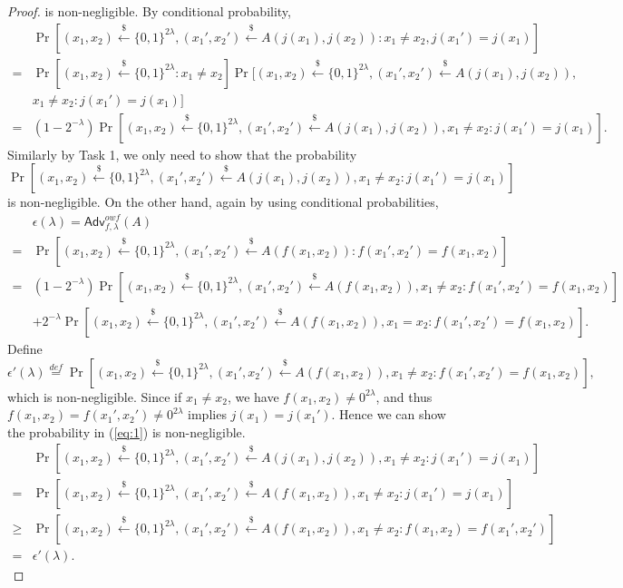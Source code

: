 \documentclass[12pt]{article}
\newcommand{\eqdef}{\stackrel{def}{=}}
\newcommand{\bits}{\{0,1\}}
\newcommand{\getsr}{\stackrel{\$}{\gets}}
\newcommand{\Adv}{\textsf{Adv}}
\theoremstyle{definition}
\begin{document}
\begin{proof}
is non-negligible.
By conditional probability,
$$
\begin{aligned}
&\Pr[(x_1, x_2) \getsr \bits^{2\lambda}, (x_1', x_2') \getsr A(j(x_1),j(x_2)) : x_1\not=x_2, j(x_1') = j(x_1)]\\
=&\Pr[(x_1, x_2) \getsr \bits^{2\lambda}: x_1\not=x_2]\Pr[(x_1, x_2) \getsr \bits^{2\lambda}, (x_1', x_2') \getsr A(j(x_1),j(x_2)), \\
&x_1\not=x_2 : j(x_1') = j(x_1)]\\
=&(1-2^{-\lambda})\Pr[(x_1, x_2) \getsr \bits^{2\lambda}, (x_1', x_2') \getsr A(j(x_1),j(x_2)), x_1\not=x_2 : j(x_1') = j(x_1)].
\end{aligned}
$$
Similarly by Task 1, we only need to show that the probability
\begin{equation}
\label{eq:1}
\Pr[(x_1, x_2) \getsr \bits^{2\lambda}, (x_1', x_2') \getsr A(j(x_1),j(x_2)), x_1\not=x_2 : j(x_1') = j(x_1)]
\end{equation}
is non-negligible. On the other hand, again by using conditional probabilities,
$$
\begin{aligned}
&\epsilon(\lambda) = \Adv_{f,\lambda}^{owf}(A) \\
=&\Pr[(x_1, x_2) \getsr \bits^{2\lambda}, (x_1', x_2') \getsr A(f(x_1,x_2)) : f(x_1',x_2') = f(x_1,x_2)]\\
=&(1-2^{-\lambda})\Pr[(x_1, x_2) \getsr \bits^{2\lambda}, (x_1', x_2') \getsr A(f(x_1,x_2)), x_1\not=x_2: f(x_1',x_2') = f(x_1,x_2)]\\
&+2^{-\lambda}\Pr[(x_1, x_2) \getsr \bits^{2\lambda}, (x_1', x_2') \getsr A(f(x_1,x_2)), x_1=x_2: f(x_1',x_2') = f(x_1,x_2)].
\end{aligned}
$$
Define 
$$\epsilon'(\lambda) \eqdef \Pr[(x_1, x_2) \getsr \bits^{2\lambda}, (x_1', x_2') \getsr A(f(x_1,x_2)), x_1\not=x_2: f(x_1',x_2') = f(x_1,x_2)],$$
which is non-negligible. Since if $x_1\not=x_2$, we have $f(x_1,x_2)\not= 0^{2\lambda}$, and thus $f(x_1,x_2) = f(x_1',x_2') \not=0^{2\lambda}$ implies $j(x_1)=j(x_1')$. Hence we can show the probability in (\ref{eq:1}) is non-negligible.
$$
\begin{aligned}
&\Pr[(x_1, x_2) \getsr \bits^{2\lambda}, (x_1', x_2') \getsr A(j(x_1),j(x_2)), x_1\not=x_2 : j(x_1') = j(x_1)] \\
=& \Pr[(x_1, x_2) \getsr \bits^{2\lambda}, (x_1', x_2') \getsr A(f(x_1,x_2)), x_1\not=x_2 : j(x_1') = j(x_1)] \\
\geq & \Pr[(x_1, x_2) \getsr \bits^{2\lambda}, (x_1', x_2') \getsr A(f(x_1,x_2)), x_1\not=x_2 : f(x_1,x_2) = f(x_1',x_2')] \\
=& \epsilon'(\lambda).
\end{aligned}$$
\end{proof}
\end{document}
